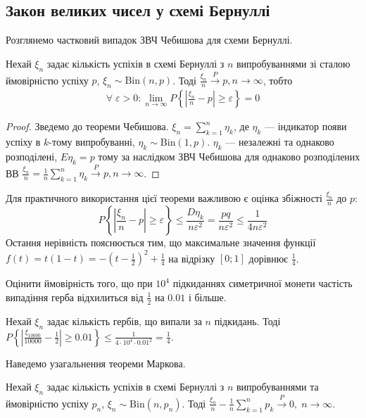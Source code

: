 \subsection{Закон великих чисел у схемі Бернуллі}
Розглянемо частковий випадок ЗВЧ Чебишова для схеми Бернуллі.
\begin{theorem*}
    Нехай $\xi_n$ задає кількість успіхів в схемі Бернуллі з $n$ випробуваннями зі сталою ймовірністю успіху $p$, $\xi_n \sim \mathrm{Bin}(n, p)$. Тоді 
    $\frac{\xi_n}{n}  \overset{P}{\longrightarrow} p, n\to\infty$, тобто
    \begin{gather}
        \forall \; \varepsilon >0 : \lim_{n \rightarrow \infty} P\left\{ \left| \frac{\xi_n}{n} - p\right| \geq \varepsilon\right\} = 0
    \end{gather}
\end{theorem*}
\begin{proof}
    Зведемо до теореми Чебишова. $\xi_n = \sum\limits_{k=1}^n \eta_k$, де $\eta_k$ --- індикатор появи успіху в $k$-тому випробуванні,
    $\eta_k \sim \mathrm{Bin}(1, p)$. $\eta_k$ --- незалежні та однаково розподілені, $E\eta_k = p$ тому за наслідком ЗВЧ Чебишова для однаково
    розподілених ВВ
    $\frac{\xi_n}{n} = \frac{1}{n} \sum\limits_{k=1}^n \eta_k \overset{P}{\longrightarrow} p, n\to\infty$.
\end{proof}
\begin{remark}
    Для практичного використання цієї теореми важливою є оцінка збіжності $\frac{\xi_n}{n}$ до $p$:
    $$P\left\{ \left| \frac{\xi_n}{n} - p\right| \geq \varepsilon\right\} \leq \frac{D\eta_k}{n \varepsilon^2} = \frac{pq}{n \varepsilon^2} \leq \frac{1}{4n \varepsilon^2}$$
    Остання нерівність пояснюється тим, що максимальне значення функції $f(t) = t(1-t) = -\left(t - \frac{1}{2}\right)^2 + \frac{1}{4}$ на відрізку $[0;1]$ дорівнює $\frac{1}{4}$.
\end{remark}
\begin{example}
    Оцінити ймовірність того, що при $10^4$ підкиданнях симетричної монети частість випадіння герба відхилиться від $\frac{1}{2}$ на $0.01$ і більше.

    Нехай $\xi_n$ задає кількість гербів, що випали за $n$ підкидань. Тоді
    $P\left\{ \left| \frac{\xi_{10000}}{10000} - \frac{1}{2}\right| \geq 0.01\right\} \leq \frac{1}{4\cdot 10^4 \cdot 0.01^2} = \frac{1}{4}$.
\end{example}
Наведемо узагальнення теореми Маркова.
\begin{theorem*}
    Нехай $\xi_n$ задає кількість успіхів в схемі Бернуллі з $n$ випробуваннями та ймовірністю успіху $p_n$, $\xi_n \sim \mathrm{Bin}(n, p_n)$.
    Тоді 
    $\frac{\xi_n}{n} - \frac{1}{n}\sum\limits_{k=1}^n p_k \overset{P}{\longrightarrow} 0, \; n \to \infty$.
\end{theorem*}

